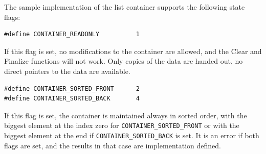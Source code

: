 \documentclass[12pt,a4paper]{memoir} %
\begin{document}
The sample implementation of the list container supports the following state flags:
\begin{verbatim}
#define CONTAINER_READONLY          1
\end{verbatim}
If this flag is set, no modifications to the container are allowed, and the Clear and Finalize functions will not work. Only copies of the data are 
handed out, no direct pointers to the data are available.
\begin{verbatim}
#define CONTAINER_SORTED_FRONT      2
#define CONTAINER_SORTED_BACK       4
\end{verbatim}
If this flag is set, the container is maintained always in sorted order, with the biggest element at the index zero for \verb,CONTAINER_SORTED_FRONT,
or with the biggest element at the end if \verb,CONTAINER_SORTED_BACK, is set. It is an error if both flags are set, and the results in that  case
are implementation defined.
\end{document}
